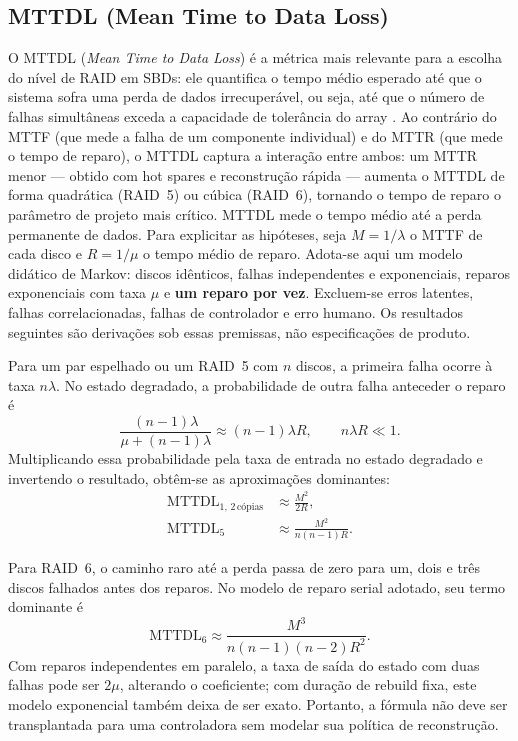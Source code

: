 \documentclass[titlepage]{article}
\begin{document}
\subsection{MTTDL (Mean Time to Data Loss)}
O MTTDL (\textit{Mean Time to Data Loss}) é a métrica mais relevante para a escolha do nível de RAID em SBDs: ele quantifica o tempo médio esperado até que o sistema sofra uma perda de dados irrecuperável, ou seja, até que o número de falhas simultâneas exceda a capacidade de tolerância do array \cite{silberschatz2020}. Ao contrário do MTTF (que mede a falha de um componente individual) e do MTTR (que mede o tempo de reparo), o MTTDL captura a interação entre ambos: um MTTR menor --- obtido com hot spares e reconstrução rápida --- aumenta o MTTDL de forma quadrática (RAID~5) ou cúbica (RAID~6), tornando o tempo de reparo o parâmetro de projeto mais crítico. MTTDL mede o tempo médio até a perda permanente de dados. Para explicitar as hipóteses, seja $M=1/\lambda$ o MTTF de cada disco e $R=1/\mu$ o tempo médio de reparo. Adota-se aqui um modelo didático de Markov: discos idênticos, falhas independentes e exponenciais, reparos exponenciais com taxa $\mu$ e \textbf{um reparo por vez}. Excluem-se erros latentes, falhas correlacionadas, falhas de controlador e erro humano. Os resultados seguintes são derivações sob essas premissas, não especificações de produto.

Para um par espelhado ou um RAID~5 com $n$ discos, a primeira falha ocorre à taxa $n\lambda$. No estado degradado, a probabilidade de outra falha anteceder o reparo é
\[
\frac{(n-1)\lambda}{\mu+(n-1)\lambda}
\approx(n-1)\lambda R,
\qquad n\lambda R\ll1.
\]
Multiplicando essa probabilidade pela taxa de entrada no estado degradado e invertendo o resultado, obtêm-se as aproximações dominantes:
\begin{align}
\mathrm{MTTDL}_{1,\,2\,\text{cópias}}&\approx\frac{M^2}{2R},\label{eq:mttdl_raid1}\\
\mathrm{MTTDL}_{5}&\approx\frac{M^2}{n(n-1)R}.\label{eq:mttdl_raid5}
\end{align}

Para RAID~6, o caminho raro até a perda passa de zero para um, dois e três discos falhados antes dos reparos. No modelo de reparo serial adotado, seu termo dominante é
\begin{equation}
\mathrm{MTTDL}_{6}\approx\frac{M^3}{n(n-1)(n-2)R^2}.
\label{eq:mttdl_raid6}
\end{equation}
Com reparos independentes em paralelo, a taxa de saída do estado com duas falhas pode ser $2\mu$, alterando o coeficiente; com duração de rebuild fixa, este modelo exponencial também deixa de ser exato. Portanto, a fórmula não deve ser transplantada para uma controladora sem modelar sua política de reconstrução.
\end{document}
